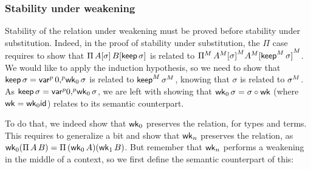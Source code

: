   \subsubsection{Stability under weakening}
  Stability of the relation under
  weakening must be proved before stability under substitution.
  Indeed, in the proof of stability under substitution, the $\Pi$ case
  requires to show that $\Pi \,A[\sigma] \,B[\mathsf{keep}\,\sigma]$ is related to
  ${\Pi}^M\,{A}^M{[\sigma]}^M
  {A}^M{[{\mathsf{keep}}^M\,\sigma]}^M$.
  We would like to apply the induction hypothesis, so we need to show that
  $\mathsf{keep}\,\sigma={\mathsf{var}}^p\,0{,}^p\mathsf{wk}_0\,\sigma$ is related to
  ${\mathsf{keep}}^M\,{\sigma}^M$, knowing that $\sigma$ is
  related to ${\sigma}^M$.
  As $\mathsf{keep}\,\sigma={\mathsf{var}}^p 0{,}^p \mathsf{wk}_0\,\sigma$, we are left with showing that
  $\mathsf{wk}_0\,\sigma=\sigma\circ\mathsf{wk}$ (where $\mathsf{wk}=\mathsf{wk}_0 \mathsf{id}$)
  relates to its semantic counterpart.

  To do that, we indeed show that $\mathsf{wk}_0$ preserves the relation, for types and terms.
  This requires to generalize a bit and show that $\mathsf{wk}_n$ preserves the relation,
  as $\mathsf{wk}_0(\Pi\,A\,B)=\Pi\,(\mathsf{wk}_0\,A)(\mathsf{wk}_1\,B)$.
  But remember that $\mathsf{wk}_n$ performs a weakening in the middle of a context, so
  we first define the semantic counterpart of this:



